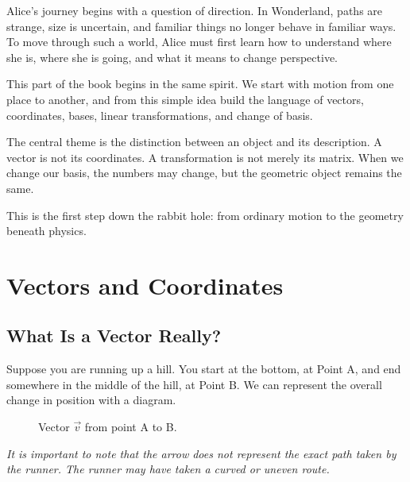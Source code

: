 \documentclass[11pt,openany]{book}
\theoremstyle{definition}
\begin{document}
Alice's journey begins with a question of direction. In Wonderland, paths are strange, 
size is uncertain, and familiar things no longer behave in familiar ways. To move through 
such a world, Alice must first learn how to understand where she is, where she is going, 
and what it means to change perspective.

\medskip

This part of the book begins in the same spirit. We start with motion from one place to 
another, and from this simple idea build the language of vectors, coordinates, bases, 
linear transformations, and change of basis.

\medskip

The central theme is the distinction between an object and its description. A vector is 
not its coordinates. A transformation is not merely its matrix. When we change our basis, 
the numbers may change, but the geometric object remains the same.

\medskip

This is the first step down the rabbit hole: from ordinary motion to the geometry beneath 
physics.


\chapter{Vectors and Coordinates}

\section{What Is a Vector Really?}

Suppose you are running up a hill. You start at the bottom, at Point A, and end somewhere in the middle of the hill, at Point B. We can represent the overall change in position with a diagram.

\begin{figure}[htbp]
\centering
{}
\caption{Vector $\vec{v}$ from point A to B.}
\label{fig:vector_diagram}
\end{figure}

\textit{It is important to note that the arrow does not represent the exact path taken by the runner. The runner may have taken a curved or uneven route. }
\end{document}
